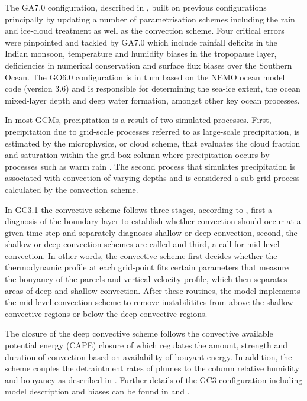 The GA7.0 configuration, described in \cite{walters2019}, built on previous configurations principally by updating a number of parametrisation schemes including the rain and ice-cloud treatment as well as the convection scheme. Four critical errors were pinpointed and tackled by GA7.0 which include rainfall deficits in the Indian monsoon, temperature and humidity biases in the tropopause layer, deficiencies in numerical conservation and surface flux biases over the Southern Ocean. The GO6.0 configuration \citep{storkey2018} is in turn based on the NEMO ocean model code (version 3.6) and is responsible for determining the sea-ice extent, the ocean mixed-layer depth and deep water formation, amongst other key ocean processes.


In most GCMs, precipitation is a result of two simulated processes. First, precipitation due to grid-scale processes referred to as large-scale precipitation, is estimated by the microphysics, or cloud scheme, that evaluates the cloud fraction and saturation within the grid-box column where precipitation occurs by processes such as warm rain \citep{walters2019}. 
The second process that simulates precipitation is associated with convection of varying depths and is considered a sub-grid process calculated by the convection scheme. 

In GC3.1 the convective scheme follows three stages, according to \cite{walters2019}, first a diagnosis of the boundary layer to establish whether convection should occur at a given time-step and separately diagnoses shallow or deep convection, second, the shallow or deep convection schemes are called and third, a call for mid-level convection. 
In other words, the convective scheme first decides whether the thermodynamic profile at each grid-point fits certain parameters that measure the bouyancy of the parcels and vertical velocity profile, which then separates areas of deep and shallow convection. After these routines, the model implements the mid-level convection scheme to remove instabilitites from above the shallow convective regions or below the deep convective regions. 

The closure of the deep convective scheme follows the convective available potential energy (CAPE) closure of \cite{fritsch} which regulates the amount, strength and duration of convection based on availability of bouyant energy. In addition, the scheme couples the detraintment rates of plumes to the column relative humidity and bouyancy as described in \cite{derbyshire2011}.
Further details of the GC3 configuration including model description and biases can be found in \cite{williams2018} and \cite{kuhlbrodt2018}.


